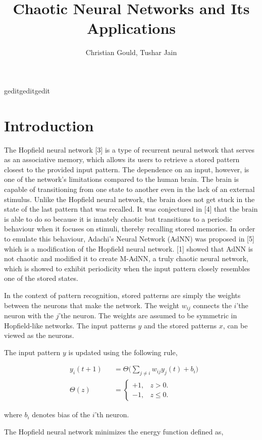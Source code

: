 geditgeditgedit\documentclass[12pt, letterpaper]{article}
\title{Chaotic Neural Networks and Its Applications}
\author{Christian Gould, Tushar Jain}
\date{}
\begin{document}
\maketitle

\section*{Introduction}

The Hopfield neural network [3] is a type of recurrent neural network that serves as an associative memory, which allows its users to retrieve a stored pattern closest to the provided input pattern. The dependence on an input, however, is one of the network's limitations compared to the human brain. The brain is capable of transitioning from one state to another even in the lack of an external stimulus. Unlike the Hopfield neural network, the brain does not get stuck in the state of the last pattern that was recalled. It was conjectured in [4] that the brain is able to do so because it is innately chaotic but transitions to a periodic behaviour when it focuses on stimuli, thereby recalling stored memories. In order to emulate this behaviour, Adachi’s Neural Network (AdNN) was proposed in [5] which is a modification of the Hopfield neural network. [1] showed that AdNN is not chaotic and modified it to create M-AdNN, a truly chaotic neural network, which is showed to exhibit periodicity when the input pattern closely resembles one of the stored states.

In the context of pattern recognition, stored patterns are simply the weights between the neurons that make the network. The weight $w_{ij}$ connects the $i$'the neuron with the $j$'the neuron. The weights are assumed to be symmetric in Hopfield-like networks. The input patterns $y$ and the stored patterns $x$, can be viewed as the neurons.

The input pattern $y$ is updated using the following rule,

$$
\begin{aligned}
& y_i(t+1) &&= \Theta\big(\sum_{j \neq i} w_{ij}y_j(t) + b_i \big)\\
& \Theta(z) &&= \begin{cases}
  +1, & z > 0.\\
  -1, & z \le 0.
  \end{cases}
\end{aligned}
$$

where $b_i$ denotes bias of the $i$'th neuron.

The Hopfield neural network minimizes the energy function defined as,
\end{document}
